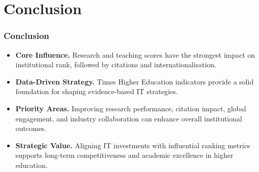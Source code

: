 \documentclass[aspectratio=169, table]{beamer}
\begin{document}
\section{Conclusion}
\begin{frame}
	\vspace{20pt}
	\frametitle{Conclusion}
	\begin{itemize}
		\item \textbf{Core Influence.} Research and teaching scores have the strongest impact on institutional rank, followed by citations and internationalisation.
		\item \textbf{Data-Driven Strategy.} Times Higher Education indicators provide a solid foundation for shaping evidence-based IT strategies.
		\item \textbf{Priority Areas.} Improving research performance, citation impact, global engagement, and industry collaboration can enhance overall institutional outcomes.
		\item \textbf{Strategic Value.} Aligning IT investments with influential ranking metrics supports long-term competitiveness and academic excellence in higher education.
	\end{itemize}
\end{frame}





\end{document}
